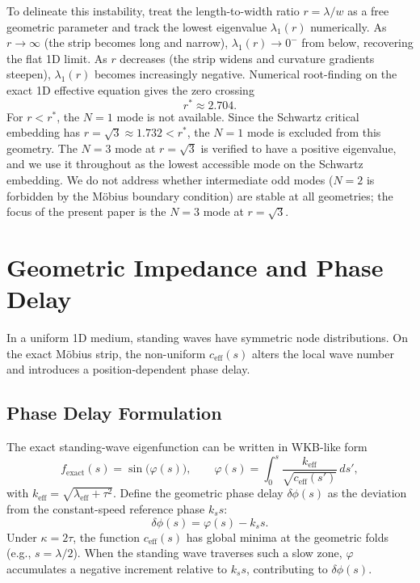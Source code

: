 \documentclass[11pt,a4paper]{article}
\begin{document}
To delineate this instability, treat the length-to-width ratio $r = \lambda/w$ as a free geometric parameter and track the lowest eigenvalue $\lambda_1(r)$ numerically. As $r \to \infty$ (the strip becomes long and narrow), $\lambda_1(r) \to 0^{-}$ from below, recovering the flat 1D limit. As $r$ decreases (the strip widens and curvature gradients steepen), $\lambda_1(r)$ becomes increasingly negative. Numerical root-finding on the exact 1D effective equation gives the zero crossing
\begin{equation}
r^* \approx 2.704.
\end{equation}
For $r < r^*$, the $N=1$ mode is not available. Since the Schwartz critical embedding has $r = \sqrt{3} \approx 1.732 < r^*$, the $N=1$ mode is excluded from this geometry. The $N=3$ mode at $r=\sqrt{3}$ is verified to have a positive eigenvalue, and we use it throughout as the lowest accessible mode on the Schwartz embedding. We do not address whether intermediate odd modes ($N=2$ is forbidden by the M\"obius boundary condition) are stable at all geometries; the focus of the present paper is the $N=3$ mode at $r=\sqrt{3}$.

\section{Geometric Impedance and Phase Delay}

In a uniform 1D medium, standing waves have symmetric node distributions. On the exact M\"obius strip, the non-uniform $c_{\text{eff}}(s)$ alters the local wave number and introduces a position-dependent phase delay.

\subsection{Phase Delay Formulation}
The exact standing-wave eigenfunction can be written in WKB-like form
\begin{equation}
f_{\text{exact}}(s) = \sin\!\big(\varphi(s)\big), \qquad \varphi(s) = \int_0^s \frac{k_{\text{eff}}}{\sqrt{c_{\text{eff}}(s')}}\, ds',
\end{equation}
with $k_{\text{eff}} = \sqrt{\lambda_{\text{eff}} + \tau^2}$. Define the geometric phase delay $\delta\phi(s)$ as the deviation from the constant-speed reference phase $k_s s$:
\begin{equation}
\delta\phi(s) = \varphi(s) - k_s s.
\end{equation}
Under $\kappa = 2\tau$, the function $c_{\text{eff}}(s)$ has global minima at the geometric folds (e.g., $s = \lambda/2$). When the standing wave traverses such a slow zone, $\varphi$ accumulates a negative increment relative to $k_s s$, contributing to $\delta\phi(s)$.
\end{document}
